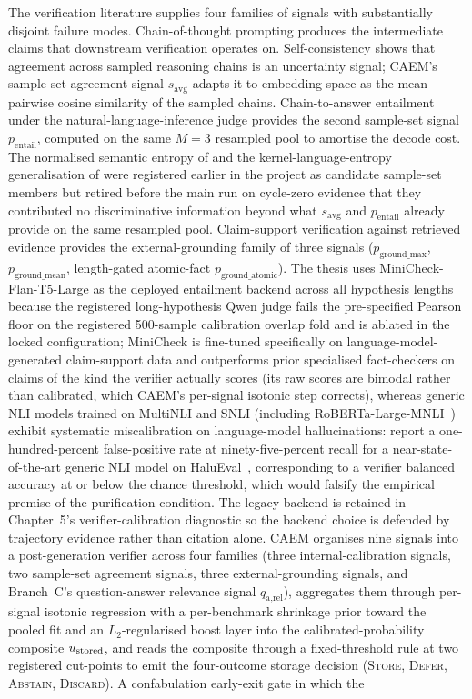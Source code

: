 The verification literature supplies four families of signals with substantially disjoint failure modes. Chain-of-thought prompting \cite{wei2022chain} produces the intermediate claims that downstream verification operates on. Self-consistency \cite{wang2023selfconsistency} shows that agreement across sampled reasoning chains is an uncertainty signal; CAEM's sample-set agreement signal $s_{\text{avg}}$ adapts it to embedding space as the mean pairwise cosine similarity of the sampled chains. Chain-to-answer entailment under the natural-language-inference judge provides the second sample-set signal $p_{\text{entail}}$, computed on the same $M{=}3$ resampled pool to amortise the decode cost. The normalised semantic entropy of \cite{farquhar2024semantic, kuhn2023semantic} and the kernel-language-entropy generalisation of \cite{nikitin2024kle} were registered earlier in the project as candidate sample-set members but retired before the main run on cycle-zero evidence that they contributed no discriminative information beyond what $s_{\text{avg}}$ and $p_{\text{entail}}$ already provide on the same resampled pool. Claim-support verification against retrieved evidence provides the external-grounding family of three signals ($p_{\text{ground\_max}}$, $p_{\text{ground\_mean}}$, length-gated atomic-fact $p_{\text{ground\_atomic}}$). The thesis uses MiniCheck-Flan-T5-Large \cite{tang2024minicheck} as the deployed entailment backend across all hypothesis lengths because the registered long-hypothesis Qwen judge fails the pre-specified Pearson floor on the registered 500-sample calibration overlap fold and is ablated in the locked configuration; MiniCheck is fine-tuned specifically on language-model-generated claim-support data and outperforms prior specialised fact-checkers on claims of the kind the verifier actually scores (its raw scores are bimodal rather than calibrated, which CAEM's per-signal isotonic step corrects), whereas generic NLI models trained on MultiNLI and SNLI (including RoBERTa-Large-MNLI~\cite{liu2019roberta}) exhibit systematic miscalibration on language-model hallucinations: \cite{sinha2025semantic} report a one-hundred-percent false-positive rate at ninety-five-percent recall for a near-state-of-the-art generic NLI model on HaluEval~\cite{li-etal-2023-halueval}, corresponding to a verifier balanced accuracy at or below the chance threshold, which would falsify the empirical premise of the purification condition. The legacy backend is retained in Chapter~5's verifier-calibration diagnostic so the backend choice is defended by trajectory evidence rather than citation alone. CAEM organises nine signals into a post-generation verifier across four families (three internal-calibration signals, two sample-set agreement signals, three external-grounding signals, and Branch~C's question-answer relevance signal $q_{\text{a,rel}}$), aggregates them through per-signal isotonic regression with a per-benchmark shrinkage prior toward the pooled fit and an $L_{2}$-regularised boost layer into the calibrated-probability composite $u_{\text{stored}}$, and reads the composite through a fixed-threshold rule at two registered cut-points to emit the four-outcome storage decision (\textsc{Store}, \textsc{Defer}, \textsc{Abstain}, \textsc{Discard}). A confabulation early-exit gate in which the 